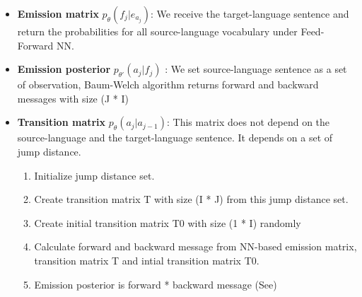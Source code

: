 \documentclass{article}
\begin{document}
\begin{itemize}
\item \textbf{Emission matrix }$p_{\theta}(f_j | e_{a_j})$: We receive the target-language sentence and return the probabilities for all source-language vocabulary under Feed-Forward NN.

\item \textbf{Emission posterior} $p_{\theta'}(a_j|f_j)$ : We set source-language sentence as a set of observation, Baum-Welch algorithm returns forward and backward messages with size (J * I)

\item \textbf{Transition matrix} $p_{\theta}(a_j | a_{j-1})$: This matrix does not depend on the source-language and the target-language sentence. It depends on a set of jump distance.
	\begin{enumerate}
	\item Initialize jump distance set.
	\item Create transition matrix T with size (I * J) from this jump distance set.
	\item Create initial transition matrix  T0 with size (1 * I) randomly
	\item Calculate forward and backward message from NN-based emission matrix, transition matrix T and intial transition matrix T0.
	\item Emission posterior is forward * backward message (See\cite{Tran16unsupervised})
	\end{enumerate}
\end{itemize}
\end{document}
